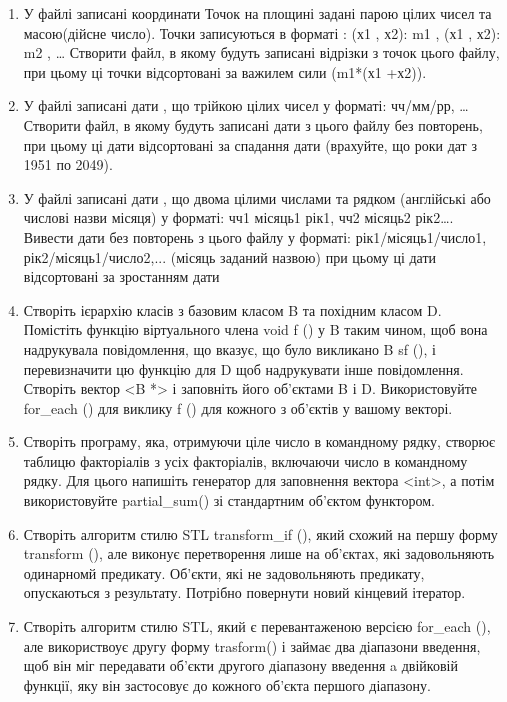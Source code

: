 \documentclass[a5paper,titlepage,openany,twoside,draft]{book_unv}%
\begin{document}
\begin{enumerate}
\item
  У файлі записані координати Точок на площині задані парою цілих чисел
  та масою(дійсне число). Точки записуються в форматі : (х1 , х2): m1 ,
  (х1 , х2): m2 , \ldots{} Створити файл, в якому будуть записані
  відрізки з точок цього файлу, при цьому ці точки відсортовані за
  важилем сили (m1*(х1 +х2)).
\item
  У файлі записані дати , що трійкою цілих чисел у форматі: чч/мм/рр,
  \ldots{} Створити файл, в якому будуть записані дати з цього файлу без
  повторень, при цьому ці дати відсортовані за спадання дати (врахуйте,
  що роки дат з 1951 по 2049).
\item
  У файлі записані дати , що двома цілими числами та рядком (англійські
  або числові назви місяця) у форматі: чч1 місяць1 рік1, чч2 місяць2
  рік2\ldots{}. Вивести дати без повторень з цього файлу у форматі:
  рік1/місяць1/число1, рік2/місяць1/число2,... (місяць заданий назвою)
  при цьому ці дати відсортовані за зростанням дати
\item
  Створіть ієрархію класів з базовим класом B та похідним класом D.
  Помістіть функцію віртуального члена void f () у B таким чином, щоб
  вона надрукувала повідомлення, що вказує, що було викликано B sf (), і
  перевизначити цю функцію для D щоб надрукувати інше повідомлення.
  Створіть вектор \textless{}B *\textgreater{} і заповніть його
  об'єктами B і D. Використовуйте for\_each () для виклику f () для
  кожного з об'єктів у вашому векторі.
\item
  Створіть програму, яка, отримуючи ціле число в командному рядку,
  створює таблицю факторіалів з усіх факторіалів, включаючи число в
  командному рядку. Для цього напишіть генератор для заповнення вектора
  \textless{}int\textgreater{}, а потім використовуйте partial\_sum() 
зі стандартним об'єктом функтором.

\item
  Створіть алгоритм стилю STL transform\_if (), який схожий на першу форму
  transform (), але виконує перетворення лише на об'єктах, які
  задовольняють одинарномй предикату. Об'єкти, які не задовольняють
  предикату, опускаються з результату. Потрібно повернути новий кінцевий
  ітератор.
\item
  Створіть алгоритм стилю STL, який є перевантаженою версією for\_each
  (), але використвоує другу форму trasform() і займає два діапазони
  введення, щоб він міг передавати об'єкти другого діапазону введення a
  двійковій функції, яку він застосовує до кожного об'єкта першого
  діапазону.


\end{enumerate}
\end{document}
